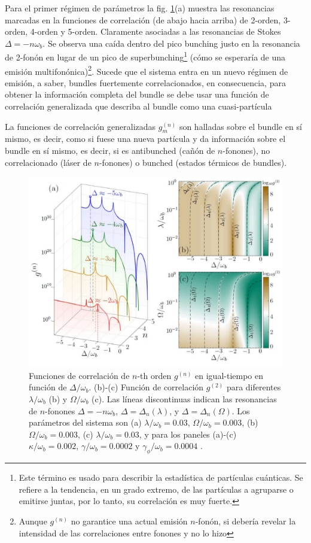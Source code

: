 \documentclass[main.tex]{subfiles}
\begin{document}
Para el primer régimen de parámetros la fig. \ref{fig:correlationbundle}(a) muestra las resonancias marcadas en la funciones de correlación (de abajo hacia arriba) de 2-orden, 3-orden, 4-orden y 5-orden. Claramente asociadas a las resonancias de Stokes $\Delta = -n\omega_b$. Se observa una caída dentro del pico bunching justo en la resonancia de 2-fonón en lugar de un pico de superbunching\footnote{Este término es usado para describir la estadística de partículas cuánticas. Se refiere a la tendencia, en un grado extremo, de las partículas a agruparse o emitirse juntas, por lo tanto, su correlación es muy fuerte.} (cómo se esperaría de una emisión multifonónica)\footnote{Aunque $g^{(n)}$ no garantice una actual emisión $n$-fonón, si debería revelar la intensidad de las correlaciones entre fonones y no lo hizo}. Sucede que el sistema entra en un nuevo régimen de emisión, a saber, bundles fuertemente correlacionados, en consecuencia,  para obtener la información completa del bundle se debe usar una función de correlación generalizada que describa al bundle como una cuasi-partícula

La funciones de correlación generalizadas $g_m^{(n)}$  son halladas sobre el bundle en sí mismo, es decir, como si fuese una nueva partícula y  da información sobre el bundle en sí mismo, es decir, si es antibunched (cañón de $n$-fonones), no correlacionado (láser de $n$-fonones) o bunched (estados térmicos de  bundles).

\begin{figure}[th]
	\centering
	\includegraphics[width=0.8\linewidth]{img/correlationBundle}
	\caption{Funciones de correlación de $n$-th orden $g^{(n)}$ en igual-tiempo en función de $\Delta/\omega_b$. (b)-(c) Función de correlación $g^{(2)}$ para diferentes $\lambda/\omega_b$ (b) y $\Omega/\omega_b$ (c). Las líneas discontinuas indican las resonancias de $n$-fonones $\Delta=-n\omega_b$, $\Delta= \Delta_n(\lambda)$, y $\Delta = \Delta_n(\Omega)$. Los parámetros del sistema son (a) $\lambda/\omega_b= 0.03$, $\Omega/\omega_b = 0.003$, (b) $\Omega/\omega_b = 0.003$, (c) $\lambda/\omega_b = 0.03$, y  para los paneles (a)-(c) $\kappa/\omega_b = 0.002$, $\gamma/\omega_b = 0.0002$ y $\gamma_\phi/\omega_b = 0.0004$ \parencite{Bin2020}.}
	\label{fig:correlationbundle}
\end{figure}
\end{document}
